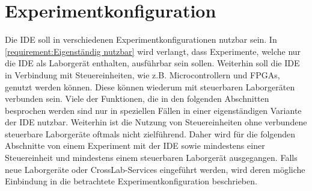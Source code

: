 \section{Experimentkonfiguration}\label{section:konzeption:experimentkonfiguration}

Die IDE soll in verschiedenen Experimentkonfigurationen nutzbar sein. In \autoref{requirement:Eigenständig nutzbar} wird verlangt, dass Experimente, welche nur die IDE als Laborgerät enthalten, ausführbar sein sollen. Weiterhin soll die IDE in Verbindung mit Steuereinheiten, wie z.B. Microcontrollern und FPGAs, genutzt werden können. Diese können wiederum mit steuerbaren Laborgeräten verbunden sein. Viele der Funktionen, die in den folgenden Abschnitten besprochen werden sind nur in speziellen Fällen in einer eigenständigen Variante der IDE nutzbar. Weiterhin ist die Nutzung von Steuereinheiten ohne verbundene steuerbare Laborgeräte oftmals nicht zielführend. Daher wird für die folgenden Abschnitte von einem Experiment mit der IDE sowie mindestens einer Steuereinheit und mindestens einem steuerbaren Laborgerät ausgegangen. Falls neue Laborgeräte oder CrossLab-Services eingeführt werden, wird deren mögliche Einbindung in die betrachtete Experimentkonfiguration beschrieben.